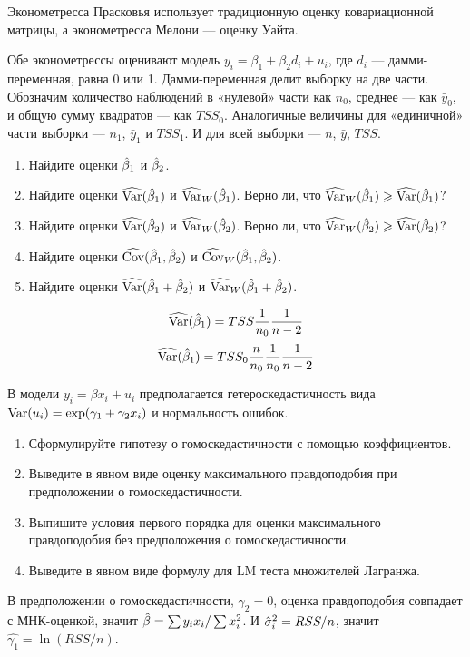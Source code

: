 \begin{problem}
Эконометресса Прасковья использует традиционную оценку ковариационной матрицы, а эконометресса Мелони — оценку Уайта.

Обе эконометрессы оценивают модель $y_i = \beta_1 + \beta_2 d_i + u_i$, где $d_i$ — дамми-переменная, равна 0 или 1. Дамми-переменная делит выборку на две части. Обозначим количество наблюдений в «нулевой» части как $n_0$, среднее — как $\bar y_0$, и общую сумму квадратов — как $TSS_0$. Аналогичные величины для «единичной» части выборки — $n_1$, $\bar y_1$ и $TSS_1$. И для всей выборки — $n$, $\bar y$, $TSS$.


  \begin{enumerate}
    \item Найдите оценки $\hat{\beta}_1$ и $\hat{\beta}_2$.
    \item Найдите оценки $\operatorname{\widehat{\operatorname{Var}}}(\hat{\beta}_1)$ и $\operatorname{\widehat{\operatorname{Var}}}_W(\hat{\beta}_1)$. Верно ли, что $\operatorname{\widehat{\operatorname{Var}}}_W(\hat{\beta}_1) \geqslant \operatorname{\widehat{\operatorname{Var}}}(\hat{\beta}_1)$?
    \item Найдите оценки $\operatorname{\widehat{\operatorname{Var}}}(\hat{\beta}_2)$ и $\operatorname{\widehat{\operatorname{Var}}}_W(\hat{\beta}_2)$. Верно ли, что $\operatorname{\widehat{\operatorname{Var}}}_W(\hat{\beta}_2) \geqslant \operatorname{\widehat{\operatorname{Var}}}(\hat{\beta}_2)$?
    \item Найдите оценки $\operatorname{\widehat{\operatorname{Cov}}}(\hat{\beta}_1, \hat{\beta}_2)$ и $\operatorname{\widehat{\operatorname{Cov}}}_W(\hat{\beta}_1, \hat{\beta}_2)$.
    \item Найдите оценки $\operatorname{\widehat{\operatorname{Var}}}(\hat{\beta}_1 + \hat{\beta}_2)$ и $\operatorname{\widehat{\operatorname{Var}}}_W(\hat{\beta}_1 + \hat{\beta}_2)$.
  \end{enumerate}

\begin{sol}
\[
\operatorname{\widehat{\operatorname{Var}}}(\hat{\beta}_1) = TSS \frac{1}{n_0}\frac{1}{n-2}
\]
\[
\operatorname{\widehat{\operatorname{Var}}}(\hat{\beta}_1) = TSS_0\frac{n}{n_0} \frac{1}{n_0}\frac{1}{n-2}
\]
\end{sol}
\end{problem}



\begin{problem}
В модели $y_i=\beta x_i+u_i$ предполагается гетероскедастичность вида $\operatorname{Var}(u_i)=\exp(\gamma_1+\gamma_2 x_i)$ и нормальность ошибок.
\begin{enumerate}
\item Сформулируйте гипотезу о гомоскедастичности с помощью коэффициентов.
\item Выведите в явном виде оценку максимального правдоподобия при предположении о гомоскедастичности.
\item Выпишите условия первого порядка для оценки максимального правдоподобия без предположения о гомоскедастичности.
\item Выведите в явном виде формулу для LM теста множителей Лагранжа.
\end{enumerate}


\begin{sol}
В предположении о гомоскедастичности, $\gamma_2=0$, оценка правдоподобия совпадает с МНК-оценкой, значит $\hat{\beta}=\sum y_i x_i/ \sum x_i^2$. И $\hat{\sigma}^2_i=RSS/n$, значит $\hat{\gamma_1}=\ln(RSS/n)$.
\end{sol}
\end{problem}

